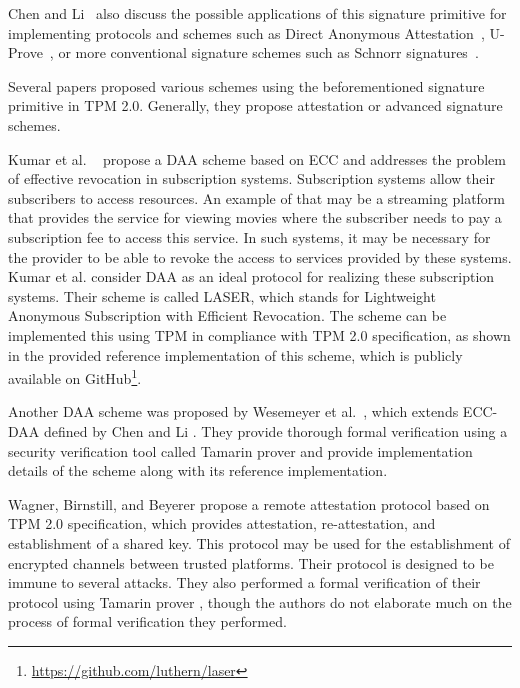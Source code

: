 Chen and Li~\cite{chen2013flexible} also discuss the possible applications of this signature primitive for implementing protocols and schemes such as Direct Anonymous Attestation~\cite{daaSpec}, U-Prove~\cite{uproveSpec}, or more conventional signature schemes such as Schnorr signatures~\cite{schnorrSpec}. 

Several papers proposed various schemes using the beforementioned signature primitive in TPM 2.0. Generally, they propose attestation or advanced signature schemes.

Kumar et al. ~\cite{kumar2018direct} propose a DAA scheme based on ECC and addresses the problem of effective revocation in subscription systems. Subscription systems allow their subscribers to access resources. An example of that may be a streaming platform that provides the service for viewing movies where the subscriber needs to pay a subscription fee to access this service. In such systems, it may be necessary for the provider to be able to revoke the access to services provided by these systems. Kumar et al. consider DAA as an ideal protocol for realizing these subscription systems. Their scheme is called LASER, which stands for Lightweight Anonymous Subscription with Efficient Revocation. The scheme can be implemented this using TPM in compliance with TPM 2.0 specification, as shown in the provided reference implementation of this scheme, which is publicly available on GitHub\footnote{\url{https://github.com/luthern/laser}}. 

Another DAA scheme was proposed by Wesemeyer et al.~\cite{wesemeyerDAA}, which extends ECC-DAA defined by Chen and Li \cite{chen2013flexible}. They provide thorough formal verification using a security verification tool called Tamarin prover \cite{meier2013tamarin} and provide implementation details of the scheme along with its reference implementation.

Wagner, Birnstill, and Beyerer \cite{wagnerRemoteAttProtocol} propose a remote attestation protocol based on TPM 2.0 specification, which provides attestation, re-attestation, and establishment of a shared key. This protocol may be used for the establishment of encrypted channels between trusted platforms. Their protocol is designed to be immune to several attacks. They also performed a formal verification of their protocol using Tamarin prover \cite{meier2013tamarin}, though the authors do not elaborate much on the process of formal verification they performed.

